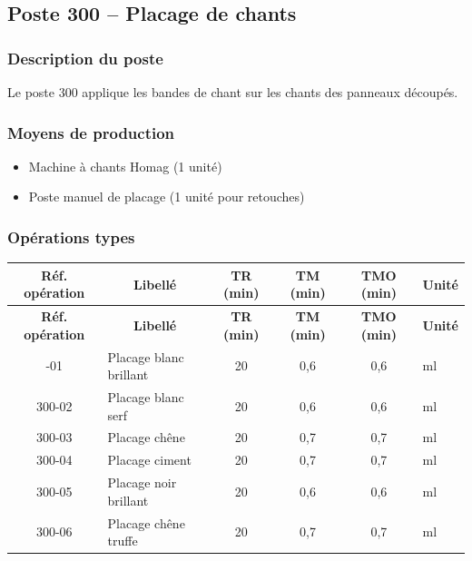 \documentclass[12pt,a4paper]{article}
\begin{document}
\subsection{Poste 300 – Placage de chants}

\subsubsection{Description du poste}
Le poste 300 applique les bandes de chant sur les chants des panneaux découpés.

\subsubsection{Moyens de production}
\begin{itemize}
    \item Machine à chants Homag (1 unité)
    \item Poste manuel de placage (1 unité pour retouches)
\end{itemize}

\subsubsection{Opérations types}

\begin{longtable}{|c|p{5cm}|c|c|c|p{3cm}|}
\hline
\multicolumn{1}{|c|}{\textbf{Réf. opération}} & \multicolumn{1}{c|}{\textbf{Libellé}} & \multicolumn{1}{c|}{\textbf{TR (min)}} & \multicolumn{1}{c|}{\textbf{TM (min)}} & \multicolumn{1}{c|}{\textbf{TMO (min)}} & \multicolumn{1}{c|}{\textbf{Unité}} \\
\hline
\endfirsthead
\hline
\multicolumn{1}{|c|}{\textbf{Réf. opération}} & \multicolumn{1}{c|}{\textbf{Libellé}} & \multicolumn{1}{c|}{\textbf{TR (min)}} & \multicolumn{1}{c|}{\textbf{TM (min)}} & \multicolumn{1}{c|}{\textbf{TMO (min)}} & \multicolumn{1}{c|}{\textbf{Unité}} \\
\hline
\endhead
\hline
\endfoot
300-01 & Placage blanc brillant & 20 & 0,6 & 0,6 & ml \\
300-02 & Placage blanc serf & 20 & 0,6 & 0,6 & ml \\
300-03 & Placage chêne & 20 & 0,7 & 0,7 & ml \\
300-04 & Placage ciment & 20 & 0,7 & 0,7 & ml \\
300-05 & Placage noir brillant & 20 & 0,6 & 0,6 & ml \\
300-06 & Placage chêne truffe & 20 & 0,7 & 0,7 & ml \\
\hline
\end{longtable}
\end{document}

